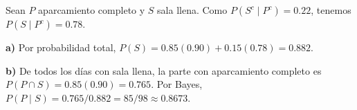 Sean $P$ aparcamiento completo y $S$ sala llena.
Como $P(S^c\mid P^c)=0.22$, tenemos $P(S\mid P^c)=0.78$.

\textbf{a)} Por probabilidad total,
$P(S)=0.85(0.90)+0.15(0.78)=\boxed{0.882}$.

\textbf{b)} De todos los días con sala llena, la parte con
aparcamiento completo es $P(P\cap S)=0.85(0.90)=0.765$.
Por Bayes, $P(P\mid S)=0.765/0.882=\boxed{85/98\approx0.8673}$.
